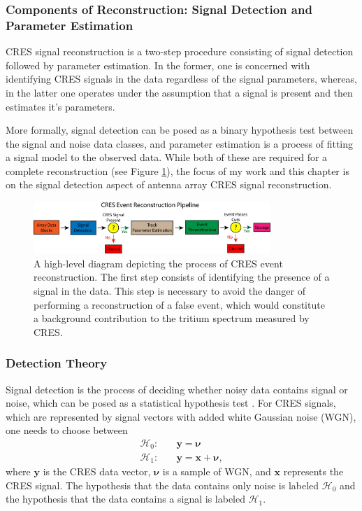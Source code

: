 \subsubsection*{Components of Reconstruction: Signal Detection and Parameter Estimation}

CRES signal reconstruction is a two-step procedure consisting of signal detection followed by parameter estimation. In the former, one is concerned with identifying CRES signals in the data regardless of the signal parameters, whereas, in the latter one operates under the assumption that a signal is present and then estimates it's parameters. 

More formally, signal detection can be posed as a binary hypothesis test between the signal and noise data classes, and parameter estimation is a process of fitting a signal model to the observed data. While both of these are required for a complete reconstruction (see Figure \ref{fig:chap4-pter-pipeline}), the focus of my work and this chapter is on the signal detection aspect of antenna array CRES signal reconstruction.

\begin{figure}[htbp]
    \centering
    \includegraphics[width=0.8\textwidth]{figs/Chapter-4/230108_deepfilter_paper_event_reconstruction_pipeline.png}
    \caption{A high-level diagram depicting the process of CRES event reconstruction. The first step consists of identifying the presence of a signal in the data. This step is necessary to avoid the danger of performing a reconstruction of a false event, which would constitute a background contribution to the tritium spectrum measured by CRES.}
    \label{fig:chap4-pter-pipeline}
\end{figure}

\subsubsection*{Detection Theory}


Signal detection is the process of deciding whether noisy data contains signal or noise, which can be posed as a statistical hypothesis test \cite{detection_theory}. For CRES signals, which are represented by signal vectors with added white Gaussian noise (WGN), one needs to choose between
\begin{align}
    \mathcal{H}_0:&\quad\bm{y}=\bm{\nu}\\
    \mathcal{H}_1:&\quad\bm{y}=\bm{x}+\bm{\nu},
\end{align}
where $\bm{y}$ is the CRES data vector, $\bm{\nu}$ is a sample of WGN, and $\bm{x}$ represents the CRES signal. The hypothesis that the data contains only noise is labeled $\mathcal{H}_0$ and the hypothesis that the data contains a signal is labeled $\mathcal{H}_1$.

